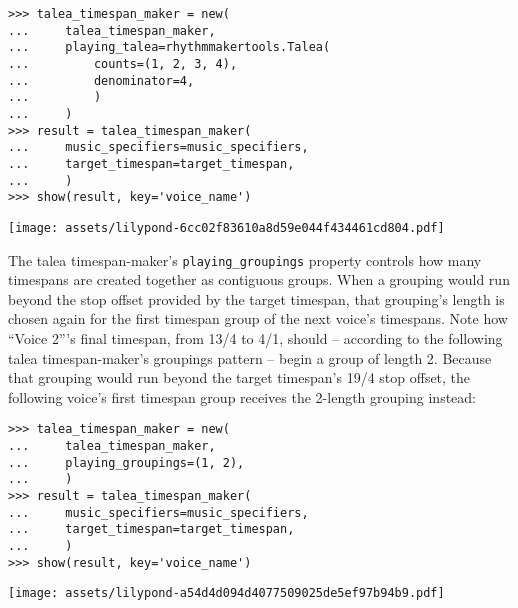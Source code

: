 \begin{abjadbookoutput}
\begin{singlespacing}
\vspace{-0.5\baselineskip}
\begin{verbatim}
>>> talea_timespan_maker = new(
...     talea_timespan_maker,
...     playing_talea=rhythmmakertools.Talea(
...         counts=(1, 2, 3, 4),
...         denominator=4,
...         )
...     )
>>> result = talea_timespan_maker(
...     music_specifiers=music_specifiers,
...     target_timespan=target_timespan,
...     )
>>> show(result, key='voice_name')
\end{verbatim}
\noindent\texttt{[image: assets/lilypond-6cc02f83610a8d59e044f434461cd804.pdf]}
\end{singlespacing}
\end{abjadbookoutput}

\noindent The talea timespan-maker's \texttt{playing\_groupings} property
controls how many timespans are created together as contiguous groups. When a
grouping would run beyond the stop offset provided by the target timespan, that
grouping's length is chosen again for the first timespan group of the next
voice's timespans. Note how \enquote{Voice 2}'s final timespan, from 13/4 to
4/1, should -- according to the following talea timespan-maker's groupings
pattern -- begin a group of length 2. Because that grouping would run beyond
the target timespan's 19/4 stop offset, the following voice's first timespan
group receives the 2-length grouping instead:

\begin{comment}
<abjad>
talea_timespan_maker = new(
    talea_timespan_maker,
    playing_groupings=(1, 2),
    )
result = talea_timespan_maker(
    music_specifiers=music_specifiers,
    target_timespan=target_timespan,
    )
show(result, key='voice_name')
</abjad>
\end{comment}

\begin{abjadbookoutput}
\begin{singlespacing}
\vspace{-0.5\baselineskip}
\begin{verbatim}
>>> talea_timespan_maker = new(
...     talea_timespan_maker,
...     playing_groupings=(1, 2),
...     )
>>> result = talea_timespan_maker(
...     music_specifiers=music_specifiers,
...     target_timespan=target_timespan,
...     )
>>> show(result, key='voice_name')
\end{verbatim}
\noindent\texttt{[image: assets/lilypond-a54d4d094d4077509025de5ef97b94b9.pdf]}
\end{singlespacing}
\end{abjadbookoutput}

